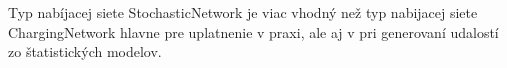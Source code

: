 Typ nabíjacej siete StochasticNetwork je viac vhodný než typ nabijacej siete ChargingNetwork hlavne pre uplatnenie v praxi, ale aj v pri generovaní udalostí zo štatistických modelov. \cite{lee2021acnsim}





\UNFIN






